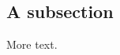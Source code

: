 \documentclass[12pt,a4paper]{report}%
\begin{document}
\subsection{A subsection}

More text.

\end{document}
